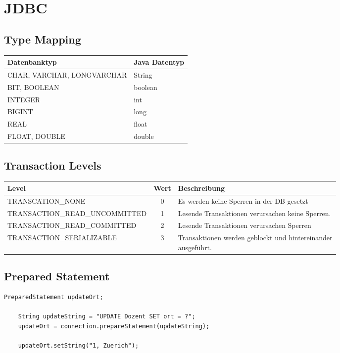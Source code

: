 \section{JDBC}

\subsection{Type Mapping}
\begin{tabular}{|l|l|}
    \hline
    \textbf{Datenbanktyp} & \textbf{Java Datentyp} \\
    \hline
    CHAR, VARCHAR, LONGVARCHAR & String \\
    \hline
    BIT, BOOLEAN &  boolean \\
    \hline
    INTEGER & int \\
    \hline
    BIGINT & long \\
    \hline
    REAL & float \\
    \hline
    FLOAT, DOUBLE & double \\
    \hline
\end{tabular}

\subsection{Transaction Levels}
\begin{tabular}{|l|c|l|}
    \hline
    \textbf{Level} & \textbf{Wert} & \textbf{Beschreibung} \\
    \hline
    TRANSCATION\_NONE & 0 & Es werden keine Sperren in der DB gesetzt \\
    \hline
    TRANSACTION\_READ\_UNCOMMITTED & 1 & Lesende Transaktionen verursachen keine Sperren. \\
    \hline
    TRANSACTION\_READ\_COMMITTED & 2 & Lesende Transaktionen verursachen Sperren \\
    \hline
    TRANSACTION\_SERIALIZABLE & 3 & \specialcell{Transaktionen werden geblockt und hintereinander\\ ausgeführt.} \\
    \hline
\end{tabular}

\subsection{Prepared Statement}

\begin{lstlisting}[style=Java]
    PreparedStatement updateOrt;
    
    String updateString = "UPDATE Dozent SET ort = ?";
    updateOrt = connection.prepareStatement(updateString);
    
    updateOrt.setString("1, Zuerich");
\end{lstlisting}

